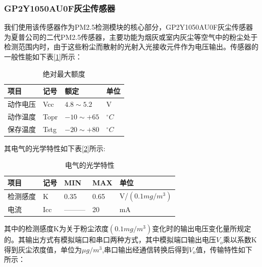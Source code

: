 \documentclass[a4paper, 11pt]{article} %
\begin{document}
\subsubsection{GP2Y1050AU0F灰尘传感器}
\par{} 我们使用该传感器作为PM2.5检测模块的核心部分，GP2Y1050AU0F灰尘传感器为夏普公司的二代PM2.5传感器，主要功能为烟灰或室内灰尘等空气中的粉尘处于检测范围内时，由于这些粉尘而散射的光射入光接收元件作为电压输出。传感器的一般性能如下表[\ref{tab1}]所示：
\begin{table}[H]
  \centering
  \caption{绝对最大额度}
  \label{tab1}
  \begin{threeparttable}
    \small
    \begin{tabular} {p{80pt}p{80pt}p{80pt}p{80pt}}
      \hline
      项目&记号&额定&单位\\
      \hline
      动作电压&Vcc&$4.8\sim 5.2$&V\\
      动作温度&Topr&$-10\sim +65$&$^{\circ}C$\\
      保存温度&Tstg&$-20 \sim +80$&$^{\circ}C$\\
      \hline
    \end{tabular}
    \small
  \end{threeparttable}
\end{table} 
\par{}其电气的光学特性如下表[\ref{tab2}]所示:

\begin{table}[H]
  \centering
  \caption{电气的光学特性}
  \label{tab2}
  \begin{threeparttable}
    \small
    \begin{tabular} {p{80pt}p{80pt}p{80pt}p{80pt}p{80pt}}
      \hline
      项目&记号&MIN&MAX&单位\\
      \hline
      检测感度&K&0.35&0.65&V/$(0.1mg/m^3)$\\
      电流&Icc&———&20&mA\\
      \hline
    \end{tabular}
    \small
  \end{threeparttable}
\end{table} 
\par{}其中的检测感度K为关于粉尘浓度$(0.1mg/m^3)$变化时的输出电压变化量所规定的。其输出方式有模拟端口和串口两种方式，其中模拟端口输出电压$V_o$乘以系数K得到灰尘浓度值，单位为$\mu g/m^3$,串口输出经通信转换后得到$V_o$值，传输特性如下所示：
\end{document}
